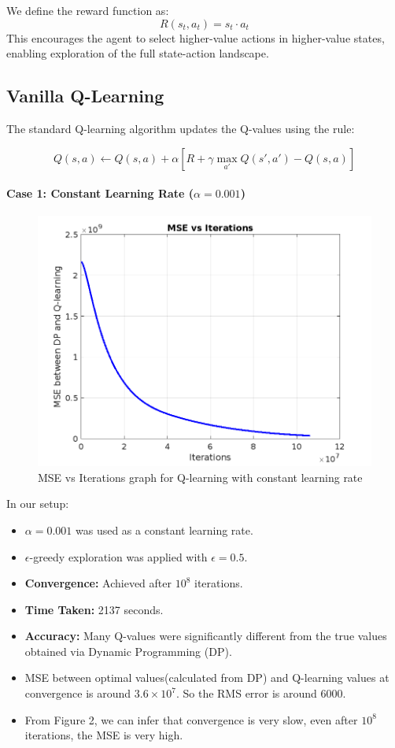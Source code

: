 \documentclass[10pt,twocolumn,letterpaper]{article}
\begin{document}
We define the reward function as:
\[
R(s_t, a_t) = s_t \cdot a_t
\]
This encourages the agent to select higher-value actions in higher-value states, enabling exploration of the full state-action landscape.

\subsection*{Vanilla Q-Learning}

The standard Q-learning algorithm updates the Q-values using the rule:
\begin{adjustwidth}{-0.75cm}{0cm}
    $$
    Q(s, a) \leftarrow Q(s, a) + \alpha \left[ R + \gamma \max_{a'} Q(s', a') - Q(s, a) \right]
    $$
\end{adjustwidth}
\paragraph{Case 1: Constant Learning Rate ($\alpha = 0.001$)}
\begin{figure}
    \centering
    \includegraphics[width=1\linewidth]{MSE.png}
    \caption{MSE vs Iterations graph for Q-learning with constant learning rate}
    \label{fig:enter-label}
\end{figure}
In our setup:
\begin{itemize}
    \item $\alpha = 0.001$ was used as a constant learning rate.
    \item $\epsilon$-greedy exploration was applied with $\epsilon = 0.5$.
    \item \textbf{Convergence:} Achieved after $10^8$ iterations.
    \item \textbf{Time Taken:} 2137 seconds.
    \item \textbf{Accuracy:} Many Q-values were significantly different from the true values obtained via Dynamic Programming (DP).
    \item MSE between optimal values(calculated from DP) and Q-learning values at convergence is around $3.6 \times 10^7$. So the RMS error is around $6000$.
    \item From Figure 2, we can infer that convergence is very slow, even after $10^8$ iterations, the MSE is very high.
\end{itemize}
\end{document}
